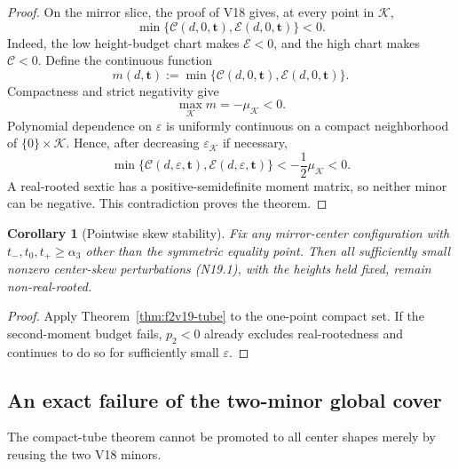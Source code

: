 \documentclass[11pt]{article}
\newtheorem{corollary}[theorem]{Corollary}
\theoremstyle{definition}
\theoremstyle{remark}
\begin{document}
\begin{proof}
On the mirror slice, the proof of V18 gives, at every point in
\(\mathcal K\),
\[
 \min\{\mathcal C(d,0,\mathbf t),
       \mathcal E(d,0,\mathbf t)\}<0.
 \tag{N19.7}
\]
Indeed, the low height-budget chart makes \(\mathcal E<0\), and the high
chart makes \(\mathcal C<0\).  Define the continuous function
\[
 m(d,\mathbf t)
 :=\min\{\mathcal C(d,0,\mathbf t),
          \mathcal E(d,0,\mathbf t)\}.
 \tag{N19.8}
\]
Compactness and strict negativity give
\[
 \max_{\mathcal K}m=-\mu_{\mathcal K}<0.
 \tag{N19.9}
\]
Polynomial dependence on \(\varepsilon\) is uniformly continuous on a
compact neighborhood of \(\{0\}\times\mathcal K\).  Hence, after decreasing
\(\varepsilon_{\mathcal K}\) if necessary,
\[
 \min\{\mathcal C(d,\varepsilon,\mathbf t),
       \mathcal E(d,\varepsilon,\mathbf t)\}
 <-\frac12\mu_{\mathcal K}<0.
 \tag{N19.10}
\]
A real-rooted sextic has a positive-semidefinite moment matrix, so neither
minor can be negative.  This contradiction proves the theorem.
\end{proof}

\begin{corollary}[Pointwise skew stability]
\label{cor:f2v19-pointwise}
Fix any mirror-center configuration with
\(t_-,t_0,t_+\geq\alpha_3\) other than the symmetric equality point.
Then all sufficiently small nonzero center-skew perturbations
\textup{(N19.1)}, with the heights held fixed, remain non-real-rooted.
\end{corollary}

\begin{proof}
Apply Theorem~\ref{thm:f2v19-tube} to the one-point compact set.  If the
second-moment budget fails, \(p_2<0\) already excludes real-rootedness and
continues to do so for sufficiently small \(\varepsilon\).
\end{proof}

\subsection{An exact failure of the two-minor global cover}

The compact-tube theorem cannot be promoted to all center shapes merely by
reusing the two V18 minors.
\end{document}

